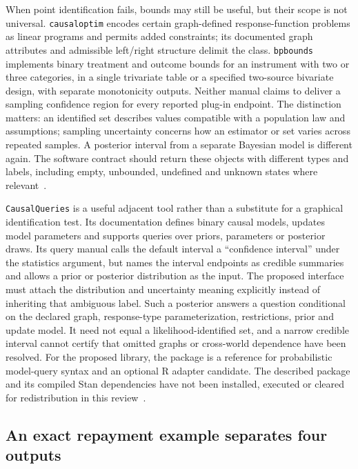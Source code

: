 When point identification fails, bounds may still be useful, but their scope is not universal. \texttt{causaloptim} encodes certain graph-defined response-function problems as linear programs and permits added constraints; its documented graph attributes and admissible left/right structure delimit the class. \texttt{bpbounds} implements binary treatment and outcome bounds for an instrument with two or three categories, in a single trivariate table or a specified two-source bivariate design, with separate monotonicity outputs. Neither manual claims to deliver a sampling confidence region for every reported plug-in endpoint. The distinction matters: an identified set describes values compatible with a population law and assumptions; sampling uncertainty concerns how an estimator or set varies across repeated samples. A posterior interval from a separate Bayesian model is different again. The software contract should return these objects with different types and labels, including empty, unbounded, undefined and unknown states where relevant~\citep{exec18_rid_causaloptim,exec18_rid_bpbounds}.

\texttt{CausalQueries} is a useful adjacent tool rather than a substitute for a graphical identification test. Its documentation defines binary causal models, updates model parameters and supports queries over priors, parameters or posterior draws. Its query manual calls the default interval a “confidence interval” under the statistics argument, but names the interval endpoints as credible summaries and allows a prior or posterior distribution as the input. The proposed interface must attach the distribution and uncertainty meaning explicitly instead of inheriting that ambiguous label. Such a posterior answers a question conditional on the declared graph, response-type parameterization, restrictions, prior and update model. It need not equal a likelihood-identified set, and a narrow credible interval cannot certify that omitted graphs or cross-world dependence have been resolved. For the proposed library, the package is a reference for probabilistic model-query syntax and an optional R adapter candidate. The described package and its compiled Stan dependencies have not been installed, executed or cleared for redistribution in this review~\citep{exec18_rid_causalqueries}.

\subsection{An exact repayment example separates four outputs}

